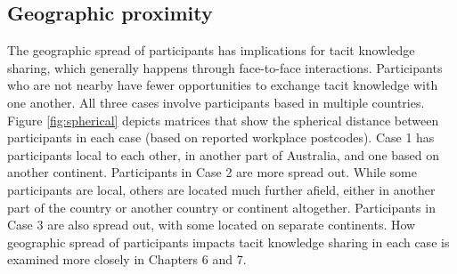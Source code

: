 \subsection{Geographic proximity}

The geographic spread of participants has implications for tacit knowledge sharing, which generally happens through face-to-face interactions. Participants who are not nearby have fewer opportunities to exchange tacit knowledge with one another. All three cases involve participants based in multiple countries. Figure \ref{fig:spherical} depicts matrices that show the spherical distance between participants in each case (based on reported workplace postcodes). Case 1 has participants local to each other, in another part of Australia, and one based on another continent. Participants in Case 2 are more spread out. While some participants are local, others are located much further afield, either in another part of the country or another country or continent altogether. Participants in Case 3 are also spread out, with some located on separate continents. How geographic spread of participants impacts tacit knowledge sharing in each case is examined more closely in Chapters 6 and 7.  \medskip

